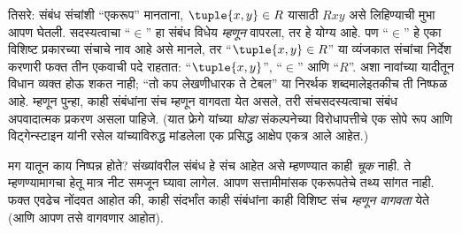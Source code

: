\documentclass[../../../include/open-logic-section]{subfiles}
\begin{document}
तिसरे: संबंध संचांशी ``एकरूप'' मानताना, $\tuple{x,y} \in R$ यासाठी
$Rxy$ असे लिहिण्याची मुभा आपण घेतली. सदस्यत्वाचा ``$\in$'' हा संबंध
विधेय \emph{म्हणून} वापरला, तर हे योग्य आहे. पण ``$\in$'' हे एका
विशिष्ट प्रकारच्या संचाचे नाव आहे असे मानले, तर ``$\tuple{x,y} \in R$''
या व्यंजकात संचांचा निर्देश करणारी फक्त तीन एकवाची पदे राहतात:
``$\tuple{x,y}$'', ``$\in$'' आणि ``$R$''. अशा नावांच्या यादीतून विधान
व्यक्त होऊ शकत नाही; ``तो कप लेखणीधारक ते टेबल'' या निरर्थक शब्दमालेइतकीच
ती निष्फळ आहे. म्हणून पुन्हा, काही संबंधांना संच म्हणून वागवता येत असले,
तरी संचसदस्यत्वाचा संबंध अपवादात्मक प्रकरण असला पाहिजे. (यात फ्रेगे यांच्या
\emph{घोडा} संकल्पनेच्या विरोधापत्तीचे एक सोपे रूप आणि विट्गेन्स्टाइन यांनी
रसेल यांच्याविरुद्ध मांडलेला एक प्रसिद्ध आक्षेप एकत्र आले आहेत.)

मग यातून काय निष्पन्न होते? संख्यांवरील संबंध हे संच आहेत असे म्हणण्यात
काही \emph{चूक} नाही. ते म्हणण्यामागचा हेतू मात्र नीट समजून घ्यावा लागेल.
आपण सत्तामीमांसक एकरूपतेचे तथ्य सांगत नाही. फक्त एवढेच नोंदवत आहोत की,
काही संदर्भांत काही संबंधांना काही विशिष्ट संच \emph{म्हणून वागवता}
येते (आणि आपण तसे वागवणार आहोत).
\end{document}
